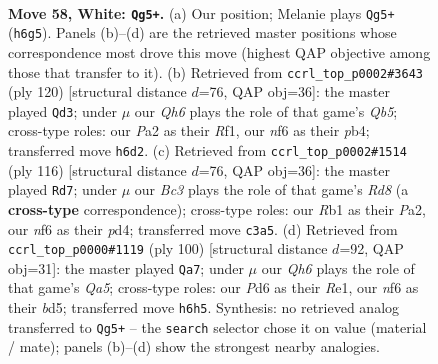 \documentclass[11pt]{article}
\begin{document}
\clearpage

\begin{figure}[p]\centering
\begin{subfigure}{0.46\textwidth}\centering
\resizebox{\linewidth}{!}{%
\newchessgame
\chessboard[
  setfen={3q2k1/3n1p2/b2P1n1Q/8/p1p4P/2B2pP1/P6K/1R6 w - - 16 58},
  showmover=false,
  pgfstyle=straightmove, color=movearrow, markmove={h6-g5}
]}
\caption{}
\end{subfigure}\hfill
\begin{subfigure}{0.46\textwidth}\centering
\resizebox{\linewidth}{!}{%
\newchessgame
\chessboard[
  setfen={5nkq/3n4/3p2p1/1QpP4/1p2P1N1/5P2/4K3/5R2 w - - 2 61},
  showmover=false,
  pgfstyle=straightmove, color=movearrow, markmove={b5-d3}
]}
\caption{}
\end{subfigure}
\\[4pt]
\begin{subfigure}{0.46\textwidth}\centering
\resizebox{\linewidth}{!}{%
\newchessgame
\chessboard[
  setfen={3R4/1p3pk1/7p/4qnp1/1P1p4/3Q3P/P5P1/6K1 w - - 7 59},
  showmover=false,
  pgfstyle=straightmove, color=movearrow, markmove={d8-d7}
]}
\caption{}
\end{subfigure}\hfill
\begin{subfigure}{0.46\textwidth}\centering
\resizebox{\linewidth}{!}{%
\newchessgame
\chessboard[
  setfen={8/2n3qk/2p3p1/Q2b3p/P7/6PP/5P2/4R1K1 w - - 1 51},
  showmover=false,
  pgfstyle=straightmove, color=movearrow, markmove={a5-a7}
]}
\caption{}
\end{subfigure}
\caption{\textbf{Move 58, White: \texttt{Qg5+}.} (a) Our position; Melanie plays \texttt{Qg5+} (\texttt{h6g5}). Panels (b)--(d) are the retrieved master positions whose correspondence most drove this move (highest QAP objective among those that transfer to it). (b) Retrieved from \texttt{ccrl\_top\_p0002\#3643} (ply 120) [structural distance $d$=76, QAP obj=36]: the master played \texttt{Qd3}; under $\mu$ our \emph{Qh6} plays the role of that game's \emph{Qb5}; cross-type roles: our \emph{P}a2 as their \emph{R}f1, our \emph{n}f6 as their \emph{p}b4; transferred move \texttt{h6d2}. (c) Retrieved from \texttt{ccrl\_top\_p0002\#1514} (ply 116) [structural distance $d$=76, QAP obj=36]: the master played \texttt{Rd7}; under $\mu$ our \emph{Bc3} plays the role of that game's \emph{Rd8} (a \textbf{cross-type} correspondence); cross-type roles: our \emph{R}b1 as their \emph{P}a2, our \emph{n}f6 as their \emph{p}d4; transferred move \texttt{c3a5}. (d) Retrieved from \texttt{ccrl\_top\_p0000\#1119} (ply 100) [structural distance $d$=92, QAP obj=31]: the master played \texttt{Qa7}; under $\mu$ our \emph{Qh6} plays the role of that game's \emph{Qa5}; cross-type roles: our \emph{P}d6 as their \emph{R}e1, our \emph{n}f6 as their \emph{b}d5; transferred move \texttt{h6h5}. Synthesis: no retrieved analog transferred to \texttt{Qg5+} -- the \texttt{search} selector chose it on value (material / mate); panels (b)--(d) show the strongest nearby analogies.}
\label{fig:thought-m114}
\end{figure}
\end{document}
